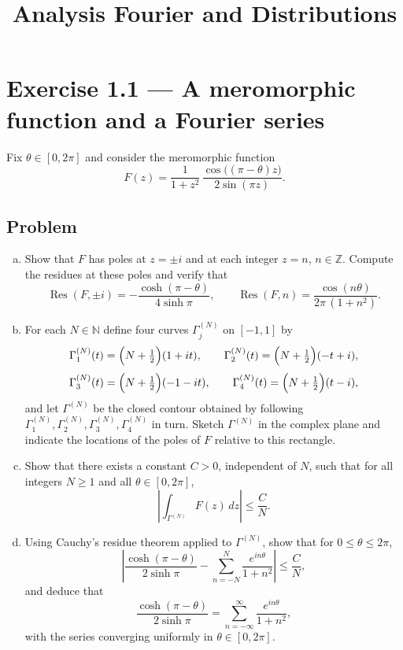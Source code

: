 \documentclass[12pt,a4paper]{article}
\title{\Large Analysis Fourier and Distributions}
\author{}
\date{}
\theoremstyle{plain}
\theoremstyle{definition}
\theoremstyle{remark}
\theoremstyle{remark}
\DeclareMathOperator{\Res}{Res}
\begin{document}
	
	\maketitle


\section*{Exercise 1.1 — A meromorphic function and a Fourier series}

Fix $\theta\in[0,2\pi]$ and consider the meromorphic function
\[
F(z) = \frac{1}{1+z^2}\,\frac{\cos\bigl((\pi-\theta)z\bigr)}{2\sin(\pi z)}.
\]

\subsection*{Problem}

\begin{enumerate}[(a)]
	\item Show that $F$ has poles at $z=\pm i$ and at each integer $z=n$, $n\in\mathbb{Z}$. Compute the residues at these poles and verify that
	\[
	\Res(F,\pm i)
	= -\frac{\cosh(\pi-\theta)}{4\sinh\pi},
	\qquad
	\Res(F,n)
	= \frac{\cos(n\theta)}{2\pi\,(1+n^2)}.
	\]
	
	\item For each $N\in\mathbb{N}$ define four curves $\Gamma^{(N)}_j$ on $[-1,1]$ by
	\[
	\Gamma^{(N)}_1(t) = \Bigl(N+\tfrac12\Bigr)(1+it),\qquad
	\Gamma^{(N)}_2(t) = \Bigl(N+\tfrac12\Bigr)(-t+i),
	\]
	\[
	\Gamma^{(N)}_3(t) = \Bigl(N+\tfrac12\Bigr)(-1-it),\qquad
	\Gamma^{(N)}_4(t) = \Bigl(N+\tfrac12\Bigr)(t-i),
	\]
	and let $\Gamma^{(N)}$ be the closed contour obtained by following
	$\Gamma^{(N)}_1,\Gamma^{(N)}_2,\Gamma^{(N)}_3,\Gamma^{(N)}_4$ in turn.
	Sketch $\Gamma^{(N)}$ in the complex plane and indicate the locations of the poles of $F$ relative to this rectangle.
	
	\item Show that there exists a constant $C>0$, independent of $N$, such that for all integers $N\ge 1$ and all $\theta\in[0,2\pi]$,
	\[
	\left| \int_{\Gamma^{(N)}} F(z)\,dz \right|
	\le \frac{C}{N}.
	\]
	
	\item Using Cauchy’s residue theorem applied to $\Gamma^{(N)}$, show that for $0\le\theta\le 2\pi$,
	\[
	\left|
	\frac{\cosh(\pi-\theta)}{2\sinh\pi}
	- \sum_{n=-N}^N \frac{e^{in\theta}}{1+n^2}
	\right|
	\le \frac{C}{N},
	\]
	and deduce that
	\[
	\frac{\cosh(\pi-\theta)}{2\sinh\pi}
	= \sum_{n=-\infty}^{\infty} \frac{e^{in\theta}}{1+n^2},
	\]
	with the series converging uniformly in $\theta\in[0,2\pi]$.
\end{enumerate}
\end{document}

